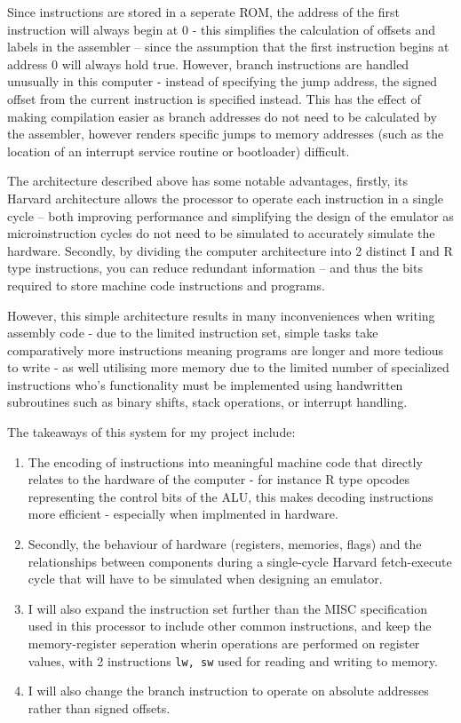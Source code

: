 Since instructions are stored in a seperate ROM, the address of the first instruction will always begin at 0 - this simplifies the calculation of offsets and labels in the assembler – since the assumption that the first instruction begins at address 0 will always hold true. However, branch instructions are handled unusually in this computer - instead of specifying the jump address, the signed offset from the current instruction is specified instead. This has the effect of making compilation easier as branch addresses do not need to be calculated by the assembler, however renders specific jumps to memory addresses (such as the location of an interrupt service routine or bootloader) difficult.

\bigskip


The architecture described above has some notable advantages, firstly, its Harvard architecture allows the processor to operate each instruction in a single cycle – both improving performance and simplifying the design of the emulator as microinstruction cycles do not need to be simulated  to accurately simulate the hardware. Secondly, by dividing the computer architecture into 2 distinct I and R type instructions, you can reduce redundant information – and thus the bits required to store machine code instructions and programs.

However, this simple architecture results in many inconveniences when writing assembly code - due to the limited instruction set, simple tasks take comparatively more instructions meaning programs are longer and more tedious to write - as well utilising more memory due to the limited number of specialized instructions who's functionality must be implemented using handwritten subroutines such as binary shifts, stack operations, or interrupt handling. 

\bigskip

The takeaways of this system for my project include:
\begin{enumerate}
    \item The encoding of instructions into meaningful machine code that directly relates to the hardware of the computer - for instance R type opcodes representing the control bits of the ALU, this makes decoding instructions more efficient - especially when implmented in hardware.
    \item Secondly, the behaviour of hardware (registers, memories, flags) and the relationships between components during a single-cycle Harvard fetch-execute cycle that will have to be simulated when designing an emulator.
    \item I will also expand the instruction set further than the MISC specification used in this processor to include other common instructions, and keep the memory-register seperation wherin operations are performed on register values, with 2 instructions \texttt{lw, sw} used for reading and writing to memory.
    \item I will also change the branch instruction to operate on absolute addresses rather than signed offsets.
\end{enumerate}

